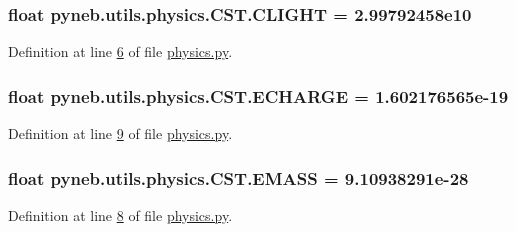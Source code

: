 \subsubsection[{C\+L\+I\+G\+H\+T}]{\setlength{\rightskip}{0pt plus 5cm}float pyneb.\+utils.\+physics.\+C\+S\+T.\+C\+L\+I\+G\+H\+T = 2.\+99792458e10\hspace{0.3cm}{\ttfamily [static]}}\label{classpyneb_1_1utils_1_1physics_1_1_c_s_t_a316a5d8a7c983441bd40589f040f3a09}


Definition at line \hyperlink{physics_8py_source_l00006}{6} of file \hyperlink{physics_8py_source}{physics.\+py}.

\hypertarget{classpyneb_1_1utils_1_1physics_1_1_c_s_t_affe8f9c45db60b472fb1779b6e88c43b}{}
\subsubsection[{E\+C\+H\+A\+R\+G\+E}]{\setlength{\rightskip}{0pt plus 5cm}float pyneb.\+utils.\+physics.\+C\+S\+T.\+E\+C\+H\+A\+R\+G\+E = 1.\+602176565e-\/19\hspace{0.3cm}{\ttfamily [static]}}\label{classpyneb_1_1utils_1_1physics_1_1_c_s_t_affe8f9c45db60b472fb1779b6e88c43b}


Definition at line \hyperlink{physics_8py_source_l00009}{9} of file \hyperlink{physics_8py_source}{physics.\+py}.

\hypertarget{classpyneb_1_1utils_1_1physics_1_1_c_s_t_a0131d55ea22f1ecb699a8d5dcf18e62e}{}
\subsubsection[{E\+M\+A\+S\+S}]{\setlength{\rightskip}{0pt plus 5cm}float pyneb.\+utils.\+physics.\+C\+S\+T.\+E\+M\+A\+S\+S = 9.\+10938291e-\/28\hspace{0.3cm}{\ttfamily [static]}}\label{classpyneb_1_1utils_1_1physics_1_1_c_s_t_a0131d55ea22f1ecb699a8d5dcf18e62e}


Definition at line \hyperlink{physics_8py_source_l00008}{8} of file \hyperlink{physics_8py_source}{physics.\+py}.

